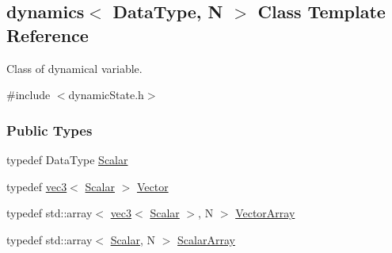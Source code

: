 \hypertarget{classdynamics}{}\subsection{dynamics$<$ Data\+Type, N $>$ Class Template Reference}
\label{classdynamics}


Class of dynamical variable.  




{\ttfamily \#include $<$dynamic\+State.\+h$>$}

\subsubsection*{Public Types}
\begin{DoxyCompactItemize}
\item 
typedef Data\+Type \mbox{\hyperlink{classdynamics_a444c7534e86115117798563cb0e43cde}{Scalar}}
\item 
typedef \mbox{\hyperlink{structvec3}{vec3}}$<$ \mbox{\hyperlink{classdynamics_a444c7534e86115117798563cb0e43cde}{Scalar}} $>$ \mbox{\hyperlink{classdynamics_a9ba7c016128ac3a2eb51f7bcfbf90243}{Vector}}
\item 
typedef std\+::array$<$ \mbox{\hyperlink{structvec3}{vec3}}$<$ \mbox{\hyperlink{classdynamics_a444c7534e86115117798563cb0e43cde}{Scalar}} $>$, N $>$ \mbox{\hyperlink{classdynamics_a41e25703d6668a66d96a1db3dc5df03b}{Vector\+Array}}
\item 
typedef std\+::array$<$ \mbox{\hyperlink{classdynamics_a444c7534e86115117798563cb0e43cde}{Scalar}}, N $>$ \mbox{\hyperlink{classdynamics_ac31f831ea1577092662dafd2daba0f48}{Scalar\+Array}}
\end{DoxyCompactItemize}
